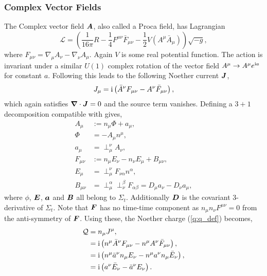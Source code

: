 \subsubsection{Complex Vector Fields} \label{q:sect:noether2}
The Complex vector field $\boldsymbol{A}$, also called a Proca field, has Lagrangian
\begin{equation}
\mathcal{L} = \left(\frac{1}{16 \pi }R -\frac{1}{4}F^{\mu\nu}\bar{F}_{\mu\nu} - \frac{1}{2}V(A^\mu \bar{A}_\mu) \right)\sqrt{-g},
\end{equation}
where $F_{\mu\nu} = \nabla_\mu A_\nu - \nabla_\nu A_\mu$. Again $V$ is some real potential function. The action is invariant under a similar $U(1)$ complex rotation of the vector field $A^\mu \rightarrow A^\mu e^{{\rm i} a}$ for constant $a$. Following \cite{Minamitsuji_2018} this leads to the following Noether current $\boldsymbol{J}$,
\begin{align}
J_\mu = {\rm i}\left(\bar{A}^\nu F_{\mu\nu} - A^\nu \bar{F}_{\mu\nu} \right),
\end{align}
which again satisfies $\boldsymbol{\nabla}\cdot \boldsymbol{J} =0$ and the source term vanishes. Defining a $3+1$ decomposition compatible with \cite{Zilh_o_2015} gives,
\begin{align}
A_\mu &:= n_\mu \Phi + a_\mu, \\
\Phi &= -A_\mu n^\mu, \\
a_\mu &= \perp^\nu_\mu A_\nu, \\
F_{\mu\nu} &:= n_\mu E_\nu - n_\nu E_\mu + B_{\mu\nu}, \\
E_\mu &= \perp^\nu_\mu F_{\nu\alpha}n^\alpha, \\
B_{\mu\nu} &= \perp^\alpha_\mu \perp^\beta_\nu F_{\alpha\beta} = D_\mu a_\nu - D_\nu a_\mu,
\end{align}
where $\phi$, $\boldsymbol{E}$, $\boldsymbol{a}$ and $\boldsymbol{B}$ all belong to $\Sigma_t$. Additionally $\boldsymbol{D}$ is the covariant 3-derivative of $\Sigma_t$. Note that $\boldsymbol{F}$ has no time-time component as $n_\mu n_\nu F^{\mu\nu} =0$ from the anti-symmetry of $\boldsymbol{F}$. Using these, the Noether charge (\ref{q:q_def}) becomes,
\begin{align}
\mathcal{Q}&= n_\mu J^\mu, \\
           &={\rm i}\left( n^\mu \bar{A}^\nu F_{\mu\nu} - n^\mu A^\nu \bar{F}_{\mu\nu}  \right), \\
           &={\rm i}\left( n^\mu \bar{a}^\nu n_\mu E_\nu - n^\mu a^\nu n_\mu \bar{E}_{\nu}  \right), \\
           &={\rm i}\left( a^\nu \bar{E}_{\nu}  - \bar{a}^\nu E_\nu  \right).
\end{align}
